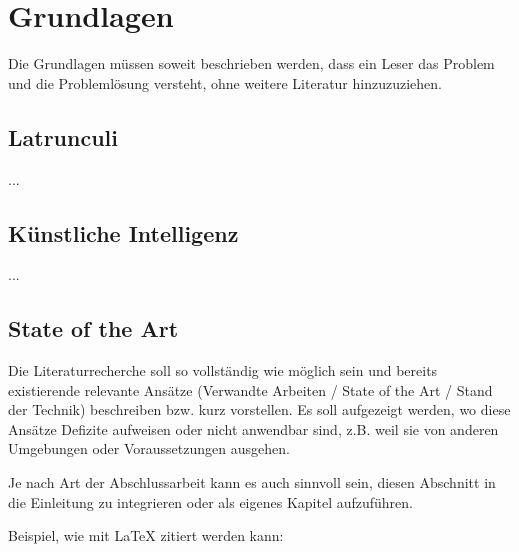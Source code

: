 
\chapter{Grundlagen}
\label{ch:Grundlagen}
Die Grundlagen müssen soweit beschrieben
werden, dass ein Leser das Problem und
die Problemlösung versteht, ohne weitere Literatur hinzuzuziehen.


\section{Latrunculi}
\label{ch:Grundlagen:sec:Abschnitt1}

...

\section{Künstliche Intelligenz}
\label{ch:Grundlagen:sec:Abschnitt2}

...

\section{State of the Art}
\label{ch:Grundlagen:sec:SOTA}
Die Literaturrecherche soll so vollständig wie möglich sein und bereits existierende relevante Ansätze (Verwandte Arbeiten / State of the Art / Stand der Technik) beschreiben bzw. kurz vorstellen.
Es soll aufgezeigt werden, wo diese Ansätze Defizite aufweisen oder nicht anwendbar sind, z.B. weil sie von anderen Umgebungen oder Voraussetzungen ausgehen.

Je nach Art der Abschlussarbeit kann es auch sinnvoll sein, diesen Abschnitt in die Einleitung zu integrieren oder als eigenes Kapitel aufzuführen.

Beispiel, wie mit LaTeX zitiert werden kann: \cite{TB98,JSAC96,qosr}

